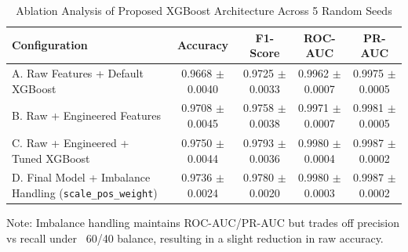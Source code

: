 \begin{table}[htbp]
\centering
\caption{Ablation Analysis of Proposed XGBoost Architecture Across 5 Random Seeds}
\label{tab:ablation}
\begin{tabular}{lcccc}
\toprule
\textbf{Configuration} & \textbf{Accuracy} & \textbf{F1-Score} & \textbf{ROC-AUC} & \textbf{PR-AUC} \\
\midrule
A. Raw Features + Default XGBoost & 0.9668 $\pm$ 0.0040 & 0.9725 $\pm$ 0.0033 & 0.9962 $\pm$ 0.0007 & 0.9975 $\pm$ 0.0005 \\
B. Raw + Engineered Features & 0.9708 $\pm$ 0.0045 & 0.9758 $\pm$ 0.0038 & 0.9971 $\pm$ 0.0007 & 0.9981 $\pm$ 0.0005 \\
C. Raw + Engineered + Tuned XGBoost & 0.9750 $\pm$ 0.0044 & 0.9793 $\pm$ 0.0036 & 0.9980 $\pm$ 0.0004 & 0.9987 $\pm$ 0.0002 \\
D. Final Model + Imbalance Handling (\texttt{scale\_pos\_weight}) & 0.9736 $\pm$ 0.0024 & 0.9780 $\pm$ 0.0020 & 0.9980 $\pm$ 0.0003 & 0.9987 $\pm$ 0.0002 \\
\bottomrule
\end{tabular}
\begin{flushleft}
\small Note: Imbalance handling maintains ROC-AUC/PR-AUC but trades off precision vs recall under ~60/40 balance, resulting in a slight reduction in raw accuracy.
\end{flushleft}
\end{table}
